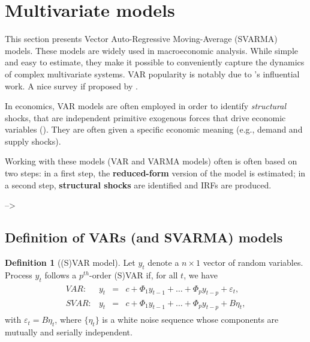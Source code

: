 \documentclass[
  12pt,
]{book}
\theoremstyle{definition}
\newtheorem{definition}{Definition}[chapter]
\theoremstyle{definition}
\theoremstyle{definition}
\theoremstyle{definition}
\theoremstyle{remark}
\begin{document}
\hypertarget{VAR}{%
\section{Multivariate models}\label{VAR}}

This section presents Vector Auto-Regressive Moving-Average (SVARMA) models. These models are widely used in macroeconomic analysis. While simple and easy to estimate, they make it possible to conveniently capture the dynamics of complex multivariate systems. VAR popularity is notably due to \citet{Sims_1980}'s influential work. A nice survey if proposed by \citet{Stock_Watson_2016}.

In economics, VAR models are often employed in order to identify \emph{structural} shocks, that are independent primitive exogenous forces that drive economic variables (\citet{Ramey_2016_NBER}). They are often given a specific economic meaning (e.g., demand and supply shocks).

Working with these models (VAR and VARMA models) often is often based on two steps: in a first step, the \textbf{reduced-form} version of the model is estimated; in a second step, \textbf{structural shocks} are identified and IRFs are produced.

--\textgreater{}

\hypertarget{definition-of-vars-and-svarma-models}{%
\subsection{Definition of VARs (and SVARMA) models}\label{definition-of-vars-and-svarma-models}}

\begin{definition}[(S)VAR model]
\protect\hypertarget{def:SVAR}{}\label{def:SVAR}Let \(y_{t}\) denote a \(n \times1\) vector of random variables. Process \(y_{t}\) follows a \(p^{th}\)-order (S)VAR if, for all \(t\), we have
\begin{eqnarray}
\begin{array}{rllll}
VAR:& y_t &=& c + \Phi_1 y_{t-1} + \dots + \Phi_p y_{t-p} + \varepsilon_t,\\
SVAR:& y_t &=& c + \Phi_1 y_{t-1} + \dots + \Phi_p y_{t-p} + B \eta_t,
\end{array}\label{eq:yVAR}
\end{eqnarray}
with \(\varepsilon_t = B\eta_t\), where \(\{\eta_{t}\}\) is a white noise sequence whose components are mutually and serially independent.
\end{definition}
\end{document}
